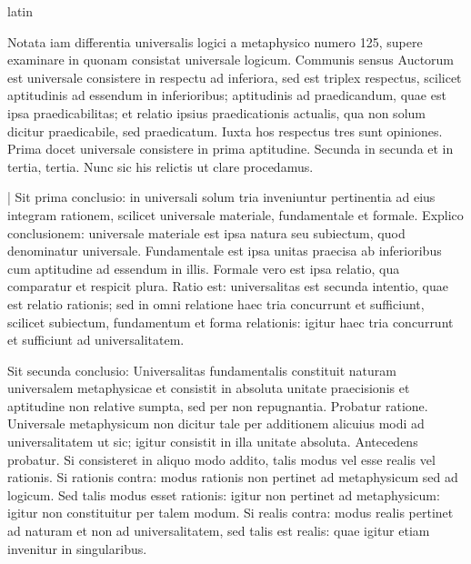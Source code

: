 \begin{otherlanguage*}{latin}
\pstart
{}
\pend

\pstart
Notata iam differentia universalis logici a metaphysico numero 125, supere examinare in quonam consistat universale logicum. Communis sensus Auctorum est universale consistere in respectu ad inferiora, sed est triplex respectus, scilicet aptitudinis ad essendum in inferioribus; aptitudinis ad praedicandum, quae est ipsa praedicabilitas; et relatio ipsius praedicationis actualis, qua non solum dicitur praedicabile, sed praedicatum. Iuxta hos respectus tres sunt opiniones. Prima docet universale consistere in prima aptitudine. Secunda in secunda et in tertia, tertia. Nunc sic his relictis ut clare procedamus. 
\pend

\pstart
\textnormal{|} Sit prima conclusio:
in universali solum tria inveniuntur pertinentia ad eius integram rationem, scilicet universale materiale, fundamentale et formale. Explico conclusionem:
universale materiale est ipsa natura seu subiectum, quod denominatur universale. Fundamentale est ipsa unitas praecisa ab inferioribus cum aptitudine ad essendum in illis. Formale vero est ipsa relatio, qua comparatur et respicit plura. Ratio est:
universalitas est secunda intentio, quae est relatio rationis; sed in omni relatione haec tria concurrunt et sufficiunt, scilicet subiectum, fundamentum et forma relationis:
igitur haec tria concurrunt et sufficiunt ad universalitatem. 
\pend

\pstart
Sit secunda conclusio:
Universalitas fundamentalis constituit naturam universalem metaphysicae et consistit in absoluta unitate praecisionis et aptitudine non relative sumpta, sed per non repugnantia. Probatur ratione. Universale metaphysicum non dicitur tale per additionem alicuius modi ad universalitatem ut sic; igitur consistit in illa unitate absoluta. Antecedens probatur. Si consisteret in aliquo modo addito, talis modus vel esse realis vel rationis. Si rationis contra:
modus rationis non pertinet ad metaphysicum sed ad logicum. Sed talis modus esset rationis:
igitur non pertinet ad metaphysicum:
igitur non constituitur per talem modum. Si realis contra:
modus realis pertinet ad naturam et non ad universalitatem, sed talis est realis:
quae igitur etiam invenitur in singularibus. 
\pend


\end{otherlanguage*}
